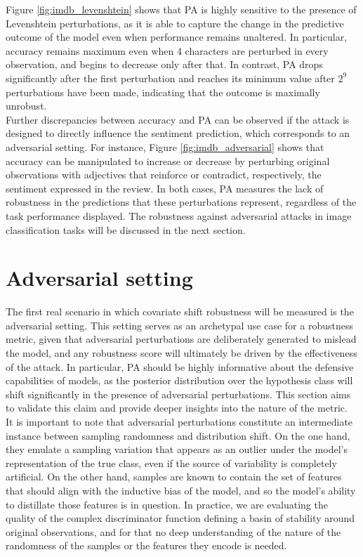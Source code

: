 Figure \ref{fig:imdb_levenshtein} shows that PA is highly sensitive to the
presence of Levenshtein perturbations, as it is able to capture the
change in the predictive outcome of the model even when performance remains 
unaltered. In particular, accuracy remains maximum even when 4 characters
are perturbed in every observation, and begins to decrease only after that. In contrast,
PA drops significantly after the first perturbation and reaches its minimum value
after $2^9$ perturbations have been made, indicating that the outcome is maximally
unrobust. \\

Further discrepancies between accuracy and PA can be observed if the 
attack is designed to directly influence the sentiment prediction, which corresponds
to an adversarial setting. For instance, Figure \ref{fig:imdb_adversarial} shows that accuracy can be 
manipulated to increase or decrease by perturbing original observations with
adjectives that reinforce or contradict, respectively, 
the sentiment expressed in the review. In both cases, PA measures the lack of robustness in the
predictions that these perturbations represent, regardless of the task
performance displayed. The robustness against adversarial attacks in
image classification tasks will be discussed in the next section. \\

\section{Adversarial setting}\label{sec:results_adversarial}

The first real scenario in which covariate shift robustness will be measured is the
adversarial setting. This setting serves as an archetypal use case for a robustness 
metric, given that adversarial perturbations are deliberately generated to mislead the
model, and any robustness score will ultimately be driven by the effectiveness of the 
attack. In particular, PA should be highly informative about the defensive capabilities 
of models, as the posterior distribution over the hypothesis class will shift 
significantly in the presence of adversarial perturbations. This section aims to validate 
this claim and provide deeper insights into the nature of the metric. \\

It is important to note that adversarial perturbations constitute an
intermediate instance between sampling randomness and distribution shift. 
On the one hand, they emulate a sampling variation that appears 
as an outlier under the model's representation of the true class, even if
the source of variability is completely artificial. On the other
hand, samples are known to contain the set of features that should 
align with the inductive bias of the model, and so the model's ability to 
distillate those features is in question. In practice, we are evaluating the 
quality of the complex discriminator function defining a basin of stability
around original observations, and for that no deep understanding of the nature of 
the randomness of the samples or the features they encode is needed.\\

